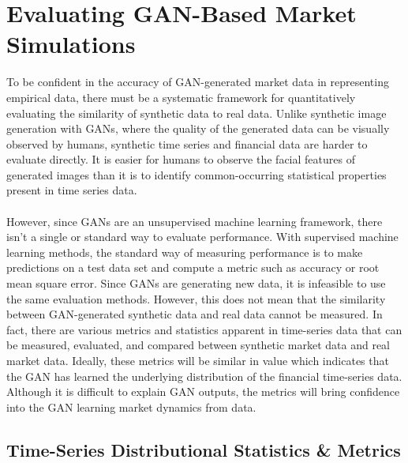 \section{Evaluating GAN-Based Market Simulations}
To be confident in the accuracy of GAN-generated market data in representing empirical data, there must be a systematic framework for quantitatively evaluating the similarity of synthetic data to real data. Unlike synthetic image generation with GANs, where the quality of the generated data can be visually observed by humans, synthetic time series and financial data are harder to evaluate directly. It is easier for humans to observe the facial features of generated images than it is to identify common-occurring statistical properties present in time series data.
\\
\\
However, since GANs are an unsupervised machine learning framework, there isn't a single or standard way to evaluate performance. With supervised machine learning methods, the standard way of measuring performance is to make predictions on a test data set and compute a metric such as accuracy or root mean square error. Since GANs are generating new data, it is infeasible to use the same evaluation methods. However, this does not mean that the similarity between GAN-generated synthetic data and real data cannot be measured. In fact, there are various metrics and statistics apparent in time-series data that can be measured, evaluated, and compared between synthetic market data and real market data. Ideally, these metrics will be similar in value which indicates that the GAN has learned the underlying distribution of the financial time-series data. Although it is difficult to explain GAN outputs, the metrics will bring confidence into the GAN learning market dynamics from data.

\subsection{Time-Series Distributional Statistics \& Metrics}

